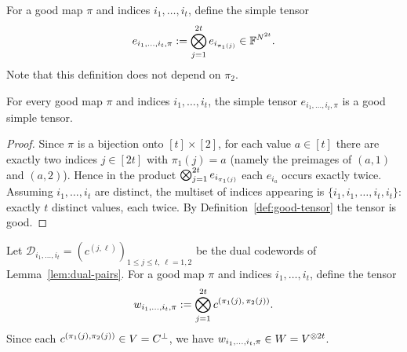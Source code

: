 \begin{definition}
  \label{def:e-tensor}
  For a good map $\pi$ and indices $i_1, \dots, i_t$, define the simple tensor
  \[
    e_{i_1, \dots, i_t, \pi} := \bigotimes_{j=1}^{2t} e_{i_{\pi_1(j)}} \in \mathbb{F}^{N^{2t}} .
  \]
  Note that this definition does not depend on $\pi_2$.
\end{definition}

\begin{lemma}
  \label{lem:e-good}
  For every good map $\pi$ and indices $i_1, \dots, i_t$, the simple tensor
  $e_{i_1, \dots, i_t, \pi}$ is a good simple tensor.
\end{lemma}
\begin{proof}
  Since $\pi$ is a bijection onto $[t] \times [2]$, for each value $a \in [t]$
  there are exactly two indices $j \in [2t]$ with $\pi_1(j) = a$ (namely the
  preimages of $(a,1)$ and $(a,2)$). Hence in the product
  $\bigotimes_{j=1}^{2t} e_{i_{\pi_1(j)}}$ each $e_{i_a}$ occurs exactly twice.
  Assuming $i_1, \dots, i_t$ are distinct, the multiset of indices appearing is
  $\{i_1, i_1, \dots, i_t, i_t\}$: exactly $t$ distinct values, each twice. By
  Definition~\ref{def:good-tensor} the tensor is good.
\end{proof}

\begin{definition}
  \label{def:w-tensor}
  Let $\mathcal{D}_{i_1, \dots, i_t} = (c^{(j,\ell)})_{1 \le j \le t,\ \ell=1,2}$
  be the dual codewords of Lemma~\ref{lem:dual-pairs}. For a good map $\pi$ and
  indices $i_1, \dots, i_t$, define the tensor
  \[
    w_{i_1, \dots, i_t, \pi} := \bigotimes_{j=1}^{2t} c^{(\pi_1(j),\, \pi_2(j))} .
  \]
  Since each $c^{(\pi_1(j),\pi_2(j))} \in V = C^{\perp}$, we have
  $w_{i_1, \dots, i_t, \pi} \in W = V^{\otimes 2t}$.
\end{definition}

